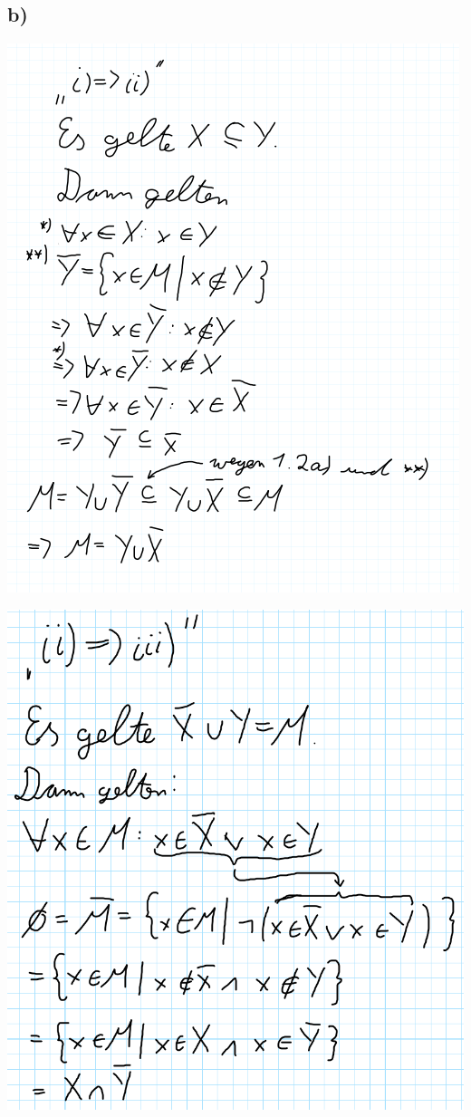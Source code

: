 \subsection*{b)}

\includegraphics[width=\textwidth]{part/S1A2bi-ii}

\includegraphics[width=\textwidth]{part/S1A2bii-iii}

